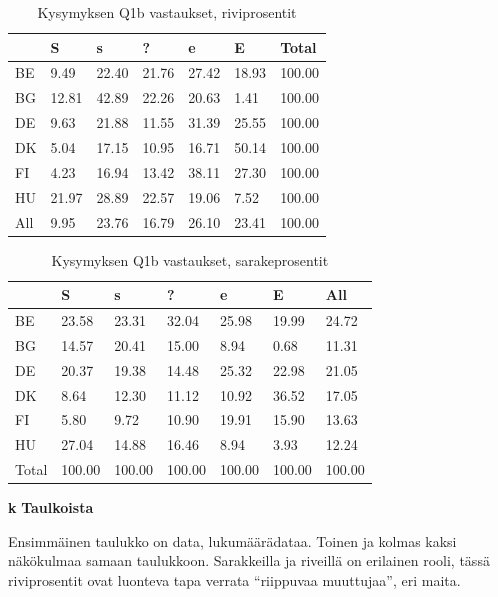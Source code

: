 \documentclass[
  finnish,
]{book}
\begin{document}
\begin{table}

\caption{\label{tab:simpeCA-rprosTa1}Kysymyksen Q1b vastaukset, riviprosentit}
\centering
\begin{tabular}[t]{lllllll}
\toprule
  & S & s & ? & e & E & Total\\
\midrule
BE & 9.49 & 22.40 & 21.76 & 27.42 & 18.93 & 100.00\\
BG & 12.81 & 42.89 & 22.26 & 20.63 & 1.41 & 100.00\\
DE & 9.63 & 21.88 & 11.55 & 31.39 & 25.55 & 100.00\\
DK & 5.04 & 17.15 & 10.95 & 16.71 & 50.14 & 100.00\\
FI & 4.23 & 16.94 & 13.42 & 38.11 & 27.30 & 100.00\\
\addlinespace
HU & 21.97 & 28.89 & 22.57 & 19.06 & 7.52 & 100.00\\
All & 9.95 & 23.76 & 16.79 & 26.10 & 23.41 & 100.00\\
\bottomrule
\end{tabular}
\end{table}

\begin{table}

\caption{\label{tab:simpeCA-cprosTa1}Kysymyksen Q1b vastaukset, sarakeprosentit}
\centering
\begin{tabular}[t]{lllllll}
\toprule
  & S & s & ? & e & E & All\\
\midrule
BE & 23.58 & 23.31 & 32.04 & 25.98 & 19.99 & 24.72\\
BG & 14.57 & 20.41 & 15.00 & 8.94 & 0.68 & 11.31\\
DE & 20.37 & 19.38 & 14.48 & 25.32 & 22.98 & 21.05\\
DK & 8.64 & 12.30 & 11.12 & 10.92 & 36.52 & 17.05\\
FI & 5.80 & 9.72 & 10.90 & 19.91 & 15.90 & 13.63\\
\addlinespace
HU & 27.04 & 14.88 & 16.46 & 8.94 & 3.93 & 12.24\\
Total & 100.00 & 100.00 & 100.00 & 100.00 & 100.00 & 100.00\\
\bottomrule
\end{tabular}
\end{table}

\textbf{k} \textbf{Taulkoista}

Ensimmäinen taulukko on data, lukumäärädataa. Toinen ja kolmas kaksi näkökulmaa
samaan taulukkoon. Sarakkeilla ja riveillä on erilainen rooli, tässä riviprosentit
ovat luonteva tapa verrata ``riippuvaa muuttujaa'', eri maita.
\end{document}
